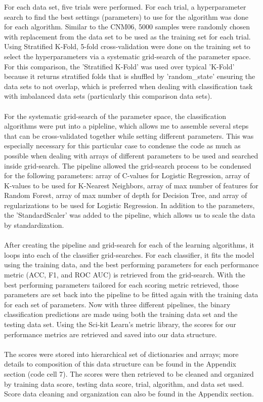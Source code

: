 \documentclass[twoside,11pt]{article}
\begin{document}
For each data set, five trials were performed. For each trial, a hyperparameter search 
to find the best settings (parameters) to use for the algorithm was done for each 
algorithm. Similar to the CNM06, 5000 samples were randomly chosen with replacement 
from the data set to be used as the training set for each trial. Using Stratified 
K-Fold, 5-fold cross-validation were done on the training set to select the 
hyperparameters via a systematic grid-search of the parameter space. For this 
comparison, the 'Stratified K-Fold' was used over typical 'K-Fold' because it returns 
stratified folds that is shuffled by 'random\_state' ensuring the data sets to not 
overlap, which is preferred when dealing with classification task with imbalanced 
data sets (particularly this comparison data sets).\\
\\
For the systematic grid-search of the parameter space, the classification algorithms 
were put into a pipleline, which allows me to assemble several steps that can be 
cross-validated together while setting different parameters. This was especially 
necessary for this particular case to condense the code as much as possible when 
dealing with arrays of different parameters to be used and searched inside grid-search. 
The pipeline allowed the grid-search process to be condensed for the following parameters: 
array of C-values for Logistic Regression, array of K-values to be used for K-Nearest 
Neighbors, array of max number of features for Random Forest, array of max number of 
depth for Decision Tree, and array of regularizations to be used for Logistic Regression.
In addition to the parameters, the 'StandardScaler' was added to the pipeline, which 
allows us to scale the data by standardization. \\
\\
After creating the pipeline and grid-search for each of the learning algorithms, 
it loops into each of the classifier grid-searches. For each classifier, it fits the 
model using the training data, and the best performing parameters for each performance 
metric (ACC, F1, and ROC AUC) is retrieved from the grid-search. With the best performing 
parameters tailored for each scoring metric retrieved, those parameters are set 
back into the pipeline to be fitted again with the training data for each set of parameters. 
Now with three different pipelines, the binary classification predictions are made 
using both the training data set and the testing data set. Using the Sci-kit Learn's 
metric library, the scores for our performance metrics are retrieved and saved 
into our data structure. \\
\\
The scores were stored into hierarchical set of dictionaries and arrays; more details 
to composition of this data structure can be found in the Appendix section (code cell 7).
The scores were then retrieved to be cleaned and organized by training data score, testing 
data score, trial, algorithm, and data set used. Score data cleaning and organization 
can also be found in the Appendix section.
\end{document}
